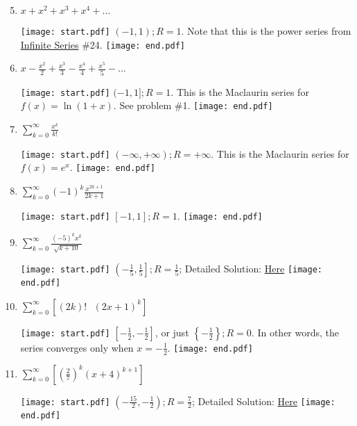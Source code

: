 \documentclass[12pt]{article}
\begin{document}
\begin{enumerate}
\setcounter{enumi}{4}

\item $x+x^2+x^3+x^4+\ldots$

\texttt{[image: start.pdf]}
{{$(-1, 1); R=1$.  Note that this is the power series from \underline{Infinite Series} \#24.}}
\texttt{[image: end.pdf]}


\item $x-\frac{x^2}{2}+\frac{x^3}{3}-\frac{x^4}{4}+\frac{x^5}{5}-\ldots$

\texttt{[image: start.pdf]}
{{$(-1, 1]; R=1$.  This is the Maclaurin series for $f(x)=\ln(1+x)$.  See problem \#1.}}
\texttt{[image: end.pdf]}


\item $\sum_{k=0}^{\infty}{\frac{x^k}{k!}}$

\texttt{[image: start.pdf]}
{{$(-\infty, +\infty); R=+\infty$.  This is the Maclaurin series for $f(x)=e^x.$}}
\texttt{[image: end.pdf]}


\item $\sum_{k=0}^{\infty}{(-1)^k\frac{x^{2k+1}}{2k+1}}$

\texttt{[image: start.pdf]}
{{$[-1, 1]; R=1$.}}
\texttt{[image: end.pdf]}


\item $\sum_{k=0}^{\infty}{\frac{(-5)^k x^k}{\sqrt{k+10}}}$

\texttt{[image: start.pdf]}
{{$\left(-\frac{1}{5}, \frac{1}{5}\right]; R=\frac{1}{5}$; Detailed Solution: \textcolor{blue}{\href{http://www.math.drexel.edu/classes/Calculus/resources/Math123HW/Solutions/123_12_Power_Series_09.pdf}{Here}}}}
\texttt{[image: end.pdf]}


\item $\sum_{k=0}^{\infty}{\left[(2k)! \text{ } (2x+1)^k\right]}$

\texttt{[image: start.pdf]}
{{$\left[-\frac{1}{2}, -\frac{1}{2}\right]$, or just $\left\{-\frac{1}{2}\right\}; R=0$.  In other words, the series converges only when $x=-\frac{1}{2}$.   }}
\texttt{[image: end.pdf]}


\item $\sum_{k=0}^{\infty}{\left[ \left( \frac{2}{7} \right)^k (x+4)^{k+1} \right] }$

\texttt{[image: start.pdf]}
{{$\left(-\frac{15}{2}, -\frac{1}{2}\right); R=\frac{7}{2}$; Detailed Solution: \textcolor{blue}{\href{http://www.math.drexel.edu/classes/Calculus/resources/Math123HW/Solutions/123_12_Power_Series_11.pdf}{Here}}}}
\texttt{[image: end.pdf]}




\end{enumerate}
\end{document}
